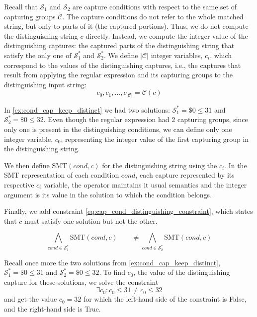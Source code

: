 Recall that \(\mathcal{S}_1\) and \(\mathcal{S}_2\) are capture conditions with respect to the same set of capturing groups \(\mathcal{C}\). The capture conditions do not refer to the whole matched string, but only to parts of it (the captured portions). Thus, we do not compute the distinguishing string \(c\) directly. Instead, we compute the integer value of the distinguishing captures: the captured parts of the distinguishing string that satisfy the only one of \(\mathcal{S}_1^*\) and \(\mathcal{S}_2^*\).
%
We define \(|\mathcal{C}|\) integer variables, \(c_i\), which correspond to the values of the distinguishing captures, i.e., the captures that result from applying the regular expression and its capturing groups to the distinguishing input string:
%
\[c_0, c_1, ..., c_{|\mathcal{C}|} = \mathcal{C}(c)\]

\begin{example}
In \autoref{ex:cond_cap_keep_distinct} we had two solutions: \(\mathcal{S}_1^* = \$0 \le 31\) and \(\mathcal{S}_2^* = \$0 \le 32\). Even though the regular expression had 2 capturing groups, since only one is present in the distinguishing conditions, we can define only one integer variable, \(c_0\), representing the integer value of the first capturing group in the distinguishing string.
\end{example}

We then define \(\textrm{SMT}(\textit{cond}, c)\) for the distinguishing string using the \(c_i\). In the \ac{SMT} representation of each condition \(\textit{cond}\), each capture represented by its respective \(c_i\) variable, the operator maintains it usual semantics and the integer argument is its value in the solution to which the condition belongs.

Finally, we add constraint \eqref{eq:cap_cond_distinguishing_constraint}, which states that \(c\) must satisfy one solution but not the other.

\begin{equation}\label{eq:cap_cond_distinguishing_constraint}
    \bigwedge_{\textit{cond} \in \mathcal{S}_1^*} \textrm{SMT}(\textit{cond}, c) \qquad\ne \bigwedge_{\textit{cond} \in \mathcal{S}_2^*} \textrm{SMT}(\textit{cond}, c)
\end{equation}

\begin{example}
Recall once more the two solutions from \autoref{ex:cond_cap_keep_distinct}, \(\mathcal{S}_1^* = \$0 \le 31\) and \(\mathcal{S}_2^* = \$0 \le 32\). To find \(c_0\), the value of the distinguishing capture for these solutions, we solve the constraint
\begin{equation*}
    \exists c_0 : c_0 \le 31 \ne c_0 \le 32
\end{equation*}
and get the value \(c_0 = 32\) for which the left-hand side of the constraint is False, and the right-hand side is True.
\end{example}

